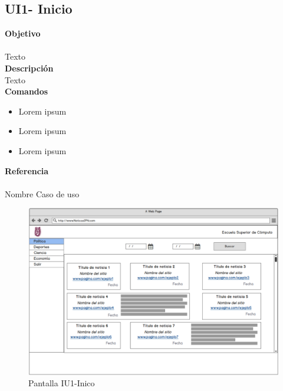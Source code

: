 \subsection{UI1- Inicio}

\Large{\textbf{Objetivo}}\\\\
\normalsize{Texto}\\

	

\Large{\textbf{Descripción}}\\
\normalsize{Texto}\\

\Large{\textbf{Comandos}}\\
\normalsize{}

\begin{itemize}
	\item Lorem ipsum
	\item Lorem ipsum
	\item Lorem ipsum
\end{itemize}


\Large{\textbf{Referencia}}\\\\
\normalsize{Nombre Caso de uso}

\begin{figure}[h]
  \centering
	\includegraphics[scale=.3]{imagenes/Pantallas/UI1}
  \caption{Pantalla IU1-Inico}
  \label{fig:IU1}
\end{figure}
